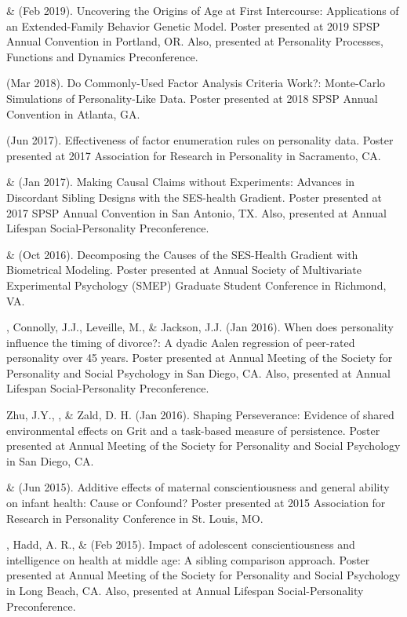 \begin{etaremune}
\item \meb \& \Joe (Feb 2019). Uncovering the Origins of Age at First Intercourse: Applications of an Extended-Family Behavior Genetic Model. Poster presented at 2019 SPSP Annual Convention in Portland, OR. Also, presented at Personality Processes, Functions and Dynamics Preconference.
%

%
\item\meb (Mar 2018). Do Commonly-Used Factor Analysis Criteria Work?: Monte-Carlo Simulations of Personality-Like Data. Poster presented at 2018 SPSP Annual Convention in Atlanta, GA. 
%
\item\meb (Jun 2017). Effectiveness of factor enumeration rules on personality data. Poster presented at 2017 Association for Research in Personality in Sacramento, CA.
%
\item\meb \& \joe (Jan 2017). Making Causal Claims without Experiments: Advances in Discordant Sibling Designs with the SES-health Gradient. Poster presented at 2017 SPSP Annual Convention in San Antonio, TX. Also, presented at Annual Lifespan Social-Personality Preconference.
%
\item\meb \& \joe (Oct 2016). Decomposing the Causes of the SES-Health Gradient with Biometrical Modeling. Poster presented at Annual Society of Multivariate Experimental Psychology (SMEP) Graduate Student Conference in Richmond, VA.
%
\item \meb, Connolly, J.J., Leveille, M., \& Jackson, J.J. (Jan 2016). When does personality influence the timing of divorce?: A dyadic Aalen regression of peer-rated personality over 45 years. Poster presented at Annual Meeting of the Society for Personality and Social Psychology in San Diego, CA. Also, presented at Annual Lifespan Social-Personality Preconference.
%
\item Zhu, J.Y., \meb, \joe \& Zald, D. H. (Jan 2016). Shaping Perseverance: Evidence of shared environmental effects on Grit and a task-based measure of persistence. Poster presented at Annual Meeting of the Society for Personality and Social Psychology in San Diego, CA.
%

\item \meb \& \joe (Jun 2015). Additive effects of maternal conscientiousness and general ability on infant health: Cause or Confound? Poster presented at 2015 Association for Research in Personality Conference in St. Louis, MO. %
%
\item \meb, Hadd, A. R., \& \joe (Feb 2015). Impact of adolescent conscientiousness and intelligence on health at middle age: A sibling comparison approach. Poster presented at Annual Meeting of the Society for Personality and Social Psychology in Long Beach, CA. Also, presented at Annual Lifespan Social-Personality Preconference.
%


\end{etaremune}
